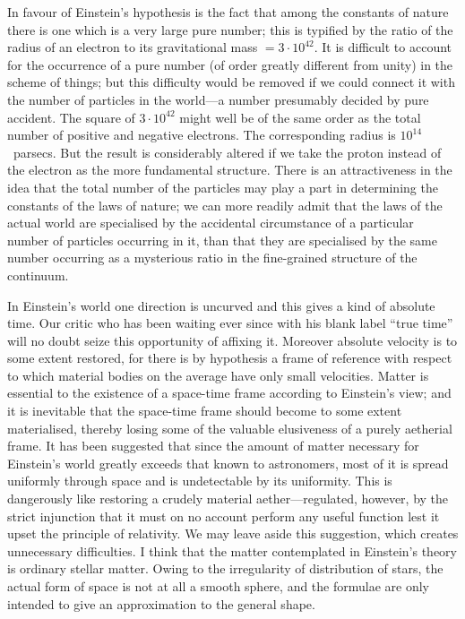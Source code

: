 \documentclass[12pt]{book}
\begin{document}
In favour of Einstein's hypothesis is the fact that among the constants of
%
nature there is one which is a very large pure number; this is typified by the
ratio of the radius of an electron to its gravitational mass $= 3 \cdot 10^{42}$. It is difficult
to account for the occurrence of a pure number (of order greatly different
from unity) in the scheme of things; but this difficulty would be removed if
we could connect it with the number of particles in the world---a number
presumably decided by pure accident\footnotemark.\footnotetext
  {The square of $3 \cdot 10^{42}$ might well be of the same order as the total number of positive and
  negative electrons. The corresponding radius is $10^{14}$~parsecs. But the result is considerably
  altered if we take the proton instead of the electron as the more fundamental structure.}
There is an attractiveness in the
idea that the total number of the particles may play a part in determining
the constants of the laws of nature; we can more readily admit that the laws
of the actual world are specialised by the accidental circumstance of a particular
number of particles occurring in it, than that they are specialised by
the same number occurring as a mysterious ratio in the fine-grained structure
of the continuum.

In Einstein's world one direction is uncurved and this gives a kind of
absolute time. Our critic who has been waiting ever since  with his blank
label ``true time'' will no doubt seize this opportunity of affixing it. Moreover
absolute velocity is to some extent restored, for there is by hypothesis a
frame of reference with respect to which material bodies on the average have
only small velocities. Matter is essential to the existence of a space-time
frame according to Einstein's view; and it is inevitable that the space-time
frame should become to some extent materialised, thereby losing some of the
valuable elusiveness of a purely aetherial frame. It has been suggested that
since the amount of matter necessary for Einstein's world greatly exceeds that
known to astronomers, most of it is spread uniformly through space and is
undetectable by its uniformity. This is dangerously like restoring a crudely
material aether---regulated, however, by the strict injunction that it must on
no account perform any useful function lest it upset the principle of relativity.
We may leave aside this suggestion, which creates unnecessary difficulties.
I think that the matter contemplated in Einstein's theory is ordinary stellar
matter. Owing to the irregularity of distribution of stars, the actual form of
space is not at all a smooth sphere, and the formulae are only intended to give
an approximation to the general shape.
\end{document}
